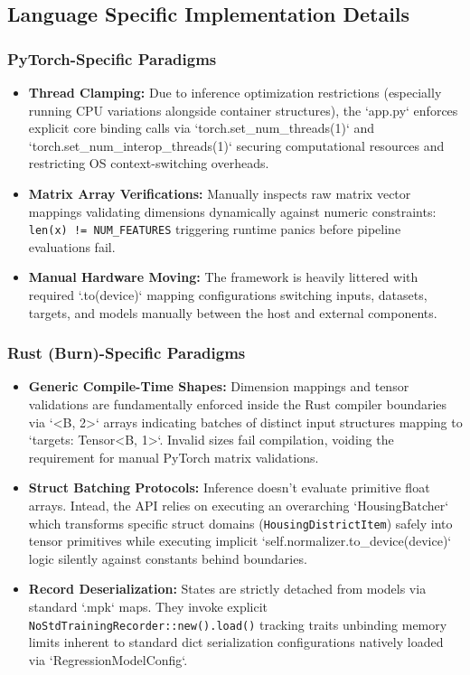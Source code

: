\documentclass{ieeeaccess}
\begin{document}
\subsection{Language Specific Implementation Details}

\subsubsection{PyTorch-Specific Paradigms}
\begin{itemize}
    \item \textbf{Thread Clamping:} Due to inference optimization restrictions (especially running CPU variations alongside container structures), the `app.py` enforces explicit core binding calls via `torch.set\_num\_threads(1)` and `torch.set\_num\_interop\_threads(1)` securing computational resources and restricting OS context-switching overheads.
    \item \textbf{Matrix Array Verifications:} Manually inspects raw matrix vector mappings validating dimensions dynamically against numeric constraints: \texttt{len(x) != NUM\_FEATURES} triggering runtime panics before pipeline evaluations fail. 
    \item \textbf{Manual Hardware Moving:} The framework is heavily littered with required `.to(device)` mapping configurations switching inputs, datasets, targets, and models manually between the host and external components.
\end{itemize}

\subsubsection{Rust (Burn)-Specific Paradigms}
\begin{itemize}
    \item \textbf{Generic Compile-Time Shapes:} Dimension mappings and tensor validations are fundamentally enforced inside the Rust compiler boundaries via `<B, 2>` arrays indicating batches of distinct input structures mapping to `targets: Tensor<B, 1>`. Invalid sizes fail compilation, voiding the requirement for manual PyTorch matrix validations.
    \item \textbf{Struct Batching Protocols:} Inference doesn't evaluate primitive float arrays. Intead, the API relies on executing an overarching `HousingBatcher` which transforms specific struct domains (\texttt{HousingDistrictItem}) safely into tensor primitives while executing implicit `self.normalizer.to\_device(device)` logic silently against constants behind boundaries.
    \item \textbf{Record Deserialization:} States are strictly detached from models via standard `.mpk` maps. They invoke explicit \texttt{NoStdTrainingRecorder::new().load()} tracking traits unbinding memory limits inherent to standard dict serialization configurations natively loaded via `RegressionModelConfig`.
\end{itemize}
\end{document}
